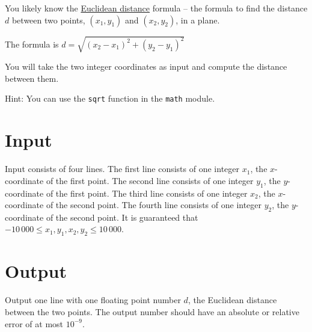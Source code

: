 
You likely know the \href{https://en.wikipedia.org/wiki/Euclidean_distance}{Euclidean distance}
formula -- the formula to find the distance $d$ between two points, $(x_1, y_1)$ and $(x_2, y_2)$, 
in a plane.

The formula is $d = \sqrt{(x_2 - x_1)^2 + (y_2 - y_1)^2}$

You will take the two integer coordinates as input and compute the distance between them.

Hint: You can use the \texttt{sqrt} function in the \texttt{math} module.

\section*{Input}
Input consists of four lines.
The first line consists of one integer $x_1$, the $x$-coordinate of the first point.
The second line consists of one integer $y_1$, the $y$-coordinate of the first point.
The third line consists of one integer $x_2$, the $x$-coordinate of the second point.
The fourth line consists of one integer $y_2$, the $y$-coordinate of the second point.
It is guaranteed that $-10\,000 \leq x_1, y_1, x_2, y_2 \leq 10\,000$.

\section*{Output}
Output one line with one floating point number $d$, the Euclidean distance between the two points.
The output number should have an absolute or relative error of at most $10^{-9}$.
